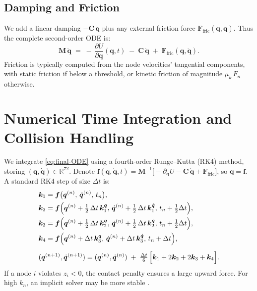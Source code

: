 \documentclass[12pt,letterpaper]{article}
\newcommand{\R}{\mathbb{R}}
\newcommand{\q}{\bm{q}}
\newcommand{\qd}{\dot{\bm{q}}}
\newcommand{\qdd}{\ddot{\bm{q}}}
\newcommand{\Mass}{\mathbf{M}}
\newcommand{\Damp}{\mathbf{C}}
\begin{document}
\subsection{Damping and Friction}
We add a linear damping $-\Damp\,\qd$ plus any external friction force $\bm{F}_{\mathrm{fric}}(\q,\qd)$.  Thus the complete second-order ODE is:
\begin{equation}
  \label{eq:final-ODE}
  \Mass\,\qdd
    \;=\;-\,\frac{\partial U}{\partial \q}(\q,t)
    \;-\;\Damp\,\qd
    \;+\;\bm{F}_{\mathrm{fric}}(\q,\qd).
\end{equation}
Friction is typically computed from the node velocities’ tangential components, with static friction if below a threshold, or kinetic friction of magnitude $\mu_k\,F_{\!n}$ otherwise.

\section{Numerical Time Integration and Collision Handling}
We integrate \eqref{eq:final-ODE} using a fourth-order Runge–Kutta (RK4) method, storing $(\q,\qd)\in\R^{72}$.  Denote $\bm{f}(\q,\qd,t)=\Mass^{-1}\bigl[-\partial_{\q} U - \Damp\,\qd + \bm{F}_{\mathrm{fric}}\bigr]$, so $\qdd=\bm{f}$.  A standard RK4 step of size $\Delta t$ is:
\[
\begin{aligned}
 &\bm{k}_1 = \bm{f}\bigl(\q^{(n)},\,\qd^{(n)},\,t_n\bigr),\\
 &\bm{k}_2 = \bm{f}\Bigl(\q^{(n)}+\tfrac12\,\Delta t\,\bm{k}_1^{\q},\,
               \qd^{(n)}+\tfrac12\,\Delta t\,\bm{k}_1^{\qd},\,
               t_n+\tfrac12\Delta t\Bigr),\\
 &\bm{k}_3 = \bm{f}\Bigl(\q^{(n)}+\tfrac12\,\Delta t\,\bm{k}_2^{\q},\,
               \qd^{(n)}+\tfrac12\,\Delta t\,\bm{k}_2^{\qd},\,
               t_n+\tfrac12\Delta t\Bigr),\\
 &\bm{k}_4 = \bm{f}\Bigl(\q^{(n)}+\Delta t\,\bm{k}_3^{\q},\,
               \qd^{(n)}+\Delta t\,\bm{k}_3^{\qd},\,
               t_n+\Delta t\Bigr),\\[5pt]
 &(\q^{(n+1)},\qd^{(n+1)})
     = (\q^{(n)},\qd^{(n)})
        \;+\;\tfrac{\Delta t}{6}\,\Bigl[\bm{k}_1+2\bm{k}_2+2\bm{k}_3+\bm{k}_4\Bigr].
\end{aligned}
\]
If a node $i$ violates $z_i<0$, the contact penalty ensures a large upward force.  For high $k_n$, an implicit solver may be more stable \cite{ZhaWuKroegerPerezMueller2020IROS}.
\end{document}
